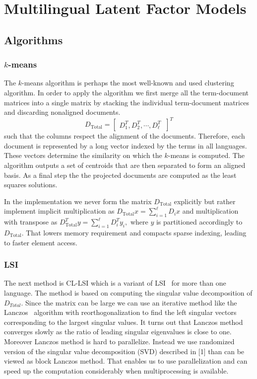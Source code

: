 \documentclass[twoside,11pt]{article}
\begin{document}
\section{Multilingual Latent Factor Models}

\subsection{Algorithms}

\subsubsection{$k$-means}

The $k$-means algorithm is perhaps the most well-known and used clustering algorithm. In order to apply the algorithm we first merge all the term-document matrices into a single matrix by stacking the individual term-document matrices and discarding nonaligned documents.
$$D_{\mbox{Total}} = \begin{bmatrix}D^T_1 ,D^T_2, \cdots,D^T_\ell\ \end{bmatrix}^T$$
such that the columns respect the alignment of the documents. Therefore, each document  is represented by a long vector indexed by the terms in all languages. These vectors determine the similarity on which the $k$-means is computed. The algorithm outputs a set of centroids that are then separated to form an aligned basis. As a final step the the projected documents are computed as the least squares solutions.

In the implementation we never form the matrix $D_{\mbox{Total}}$ explicitly but rather implement implicit multiplication as $D_{\mbox{Total}} x = \sum_{i=1}^\ell D_i x$ and multiplication with transpose as $D_{\mbox{Total}}^T y = \sum_{i=1}^\ell D_i^T y_i,$ where $y$ is partitioned accordingly to $D_{\mbox{Total}}.$ That lowers memory requirement and compacts sparse indexing, leading to faster element access. 

\subsubsection{LSI}

The next method is CL-LSI which is a variant of LSI~\cite{lsi} for more than one language. The method is based on computing the singular value decomposition of $D_{Total}$. Since the matrix can be large we can use an iterative method like the Lanczos~\cite{matrix_comp} algorithm with reorthogonalization to find the left singular vectors corresponding to the largest singular values. It turns out that Lanczos method converges slowly as the ratio of leading singular eigenvalues is close to one. Moreover Lanczos method is hard to parallelize. Instead we use randomized version of the singular value decomposition (SVD) described in [1] than can be viewed as block Lanczos method. That enables us to use parallelization and can speed up the computation considerably when multiprocessing is available.
\end{document}
